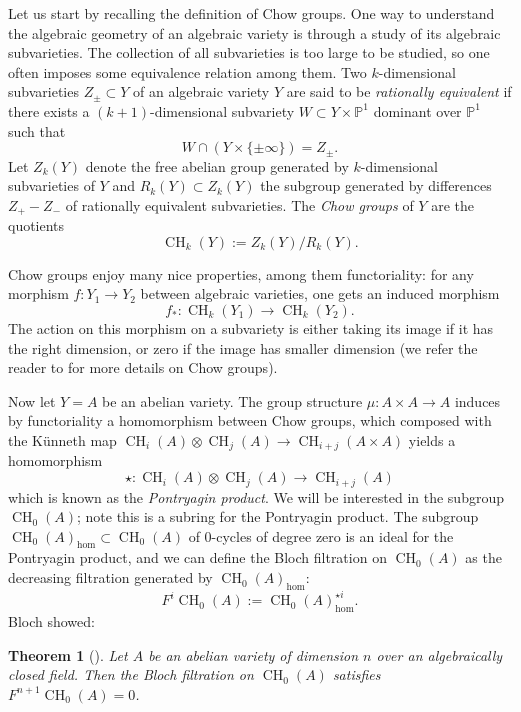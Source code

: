 \documentclass[10pt]{amsart}
\newtheorem{thm}{Theorem}[section]
\theoremstyle{definition}
\theoremstyle{remark}
\def\P{\mathbb{P}}
\DeclareMathOperator{\CH}{CH}
\def\x{\times}
\begin{document}
Let us start by recalling the definition of Chow groups.
One way to understand the algebraic geometry of an algebraic variety is through a study of its algebraic subvarieties.
The collection of all subvarieties is too large to be studied, so one often imposes some equivalence relation among them.
Two $k$-dimensional subvarieties $Z_\pm \subset Y$ of an algebraic variety $Y$ are said to be \emph{rationally equivalent} if there exists a $(k+1)$-dimensional subvariety $W \subset Y \x \P^1$ dominant over $\P^1$  such that
$$
W \cap (Y \x \{\pm\infty\}) = Z_\pm.
$$
Let $Z_k(Y)$ denote the free abelian group generated by $k$-dimensional subvarieties of $Y$ and $R_k(Y) \subset Z_k(Y)$ the subgroup generated by differences $Z_+ - Z_-$ of rationally equivalent subvarieties.
The \emph{Chow groups} of $Y$ are the quotients
$$
\CH_k(Y) := Z_k(Y) / R_k(Y).
$$

Chow groups enjoy many nice properties, among them functoriality: for any morphism $f: Y_1 \to Y_2$ between algebraic varieties, one gets an induced morphism 
$$
f_*: \CH_k(Y_1) \to \CH_k(Y_2).
$$
The action on this morphism on a subvariety is either taking its image if it has the right dimension, or zero if the image has smaller dimension (we refer the reader to \cite{fulton2013intersection} for more details on Chow groups).

Now let $Y = A$ be an abelian variety. 
The group structure $\mu : A \x A \to A$ induces by functoriality a homomorphism between Chow groups, which composed with the Künneth map $\CH_i(A)\otimes \CH_j(A) \to \CH_{i+j}(A \x A)$ 
yields a homomorphism 
\begin{equation}\label{eq:CH_pontryagin}
    \star : \CH_i(A) \otimes \CH_j(A) \to \CH_{i+j}(A)
\end{equation}
which is known as the \emph{Pontryagin product}.
We will be interested in the subgroup $\CH_0(A)$; note this is a subring for the Pontryagin product.
The subgroup $\CH_0(A)_{\hom} \subset \CH_0(A)$ of $0$-cycles of degree zero is an ideal for the Pontryagin product, and we can define the Bloch filtration on $\CH_0(A)$ as the decreasing filtration generated by $\CH_0(A)_{\hom}$:
$$
F^i\CH_0(A) := \CH_0(A)_{\hom}^{\star i}.
$$
Bloch showed:
\begin{thm}[\cite{bloch1976some}]\label{thm:bloch}
    Let $A$ be an abelian variety of dimension $n$ over an algebraically closed field.
    Then the Bloch filtration on $\CH_0(A)$ satisfies $F^{n+1}\CH_0(A) = 0$.
\end{thm}
\end{document}
